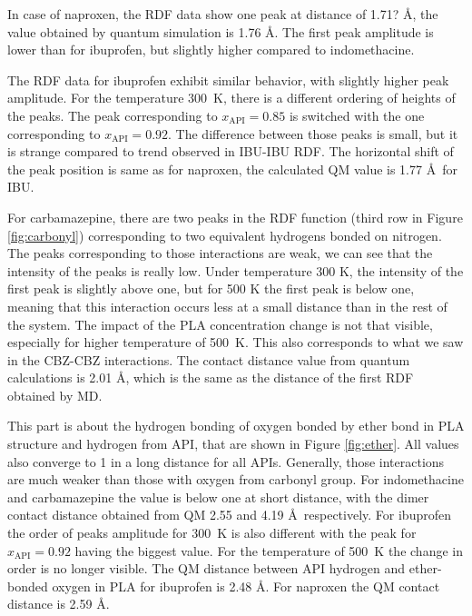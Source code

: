In case of naproxen, the RDF data show one peak at distance of 1.71? \AA, the value obtained by quantum simulation is 1.76 \AA. The first peak amplitude is lower than for ibuprofen, but slightly higher compared to indomethacine. 

The RDF data for ibuprofen exhibit similar behavior, with slightly higher peak amplitude. For the temperature 300~K, there is a different ordering of heights of the peaks. The peak corresponding to $x_\text{API}=0.85$ is switched with the one corresponding to $x_\text{API}=0.92$. The difference between those peaks is small, but it is strange compared to trend observed in IBU-IBU RDF. The horizontal shift of the peak position is same as for naproxen, the calculated QM value is 1.77 \AA~for IBU.

For carbamazepine, there are two peaks in the RDF function (third row in Figure \ref{fig:carbonyl}) corresponding to two equivalent hydrogens bonded on nitrogen. The peaks corresponding to those interactions are weak, we can see that the intensity of the peaks is really low. Under temperature 300 K, the intensity of the first peak is slightly above one, but for 500 K the first peak is below one, meaning that this interaction occurs less at a small distance than in the rest of the system. The impact of the PLA concentration change is not that visible, especially for higher temperature of 500~K. This also corresponds to what we saw in the CBZ-CBZ interactions. The contact distance value from quantum calculations is 2.01 \AA, which is the same as the distance of the first RDF obtained by MD.


This part is about the hydrogen bonding of oxygen bonded by ether bond in PLA structure and hydrogen from API, that are shown in Figure \ref{fig:ether}. All values also converge to 1 in a long distance for all APIs. Generally, those interactions are much weaker than those with oxygen from carbonyl group. For indomethacine and carbamazepine the value is below one at short distance, with the dimer contact distance obtained from QM 2.55 and 4.19 \AA~respectively. For ibuprofen the order of peaks amplitude for 300~K is also different with the peak for $x_\text{API}=0.92$ having the biggest value. For the temperature of 500~K the change in order is no longer visible. The QM distance between API hydrogen and ether-bonded oxygen in PLA for ibuprofen is 2.48 \AA. For naproxen the QM contact distance is 2.59 \AA. 


